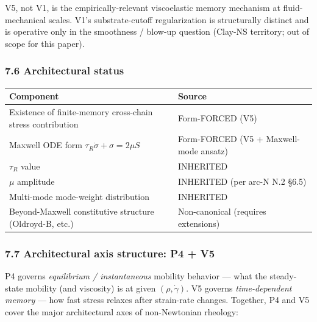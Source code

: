 \documentclass[
  11pt,a4paper]{article}
\newcounter{none} %
\begin{document}
V5, not V1, is the empirically-relevant viscoelastic memory mechanism at
fluid-mechanical scales. V1's substrate-cutoff regularization is
structurally distinct and is operative only in the smoothness / blow-up
question (Clay-NS territory; out of scope for this paper).

\subsubsection{7.6 Architectural status}\label{architectural-status}

{\def\LTcaptype{none} %
\begin{longtable}[]{@{}
  >{\raggedright\arraybackslash}p{}
  >{\raggedright\arraybackslash}p{}@{}}
\toprule\noalign{}
\begin{minipage}[b]{\linewidth}\raggedright
Component
\end{minipage} & \begin{minipage}[b]{\linewidth}\raggedright
Source
\end{minipage} \\
\midrule\noalign{}
\endhead
\bottomrule\noalign{}
\endlastfoot
Existence of finite-memory cross-chain stress contribution & Form-FORCED
(V5) \\
Maxwell ODE form \(\tau_R \dot\sigma + \sigma = 2\mu S\) & Form-FORCED
(V5 + Maxwell-mode ansatz) \\
\(\tau_R\) value & INHERITED \\
\(\mu\) amplitude & INHERITED (per arc-N N.2 §6.5) \\
Multi-mode mode-weight distribution & INHERITED \\
Beyond-Maxwell constitutive structure (Oldroyd-B, etc.) & Non-canonical
(requires extensions) \\
\end{longtable}
}

\subsubsection{7.7 Architectural axis structure: P4 +
V5}\label{architectural-axis-structure-p4-v5}

P4 governs \emph{equilibrium / instantaneous} mobility behavior --- what
the steady-state mobility (and viscosity) is at given
\((\rho, \dot\gamma)\). V5 governs \emph{time-dependent memory} --- how
fast stress relaxes after strain-rate changes. Together, P4 and V5 cover
the major architectural axes of non-Newtonian rheology:
\end{document}

